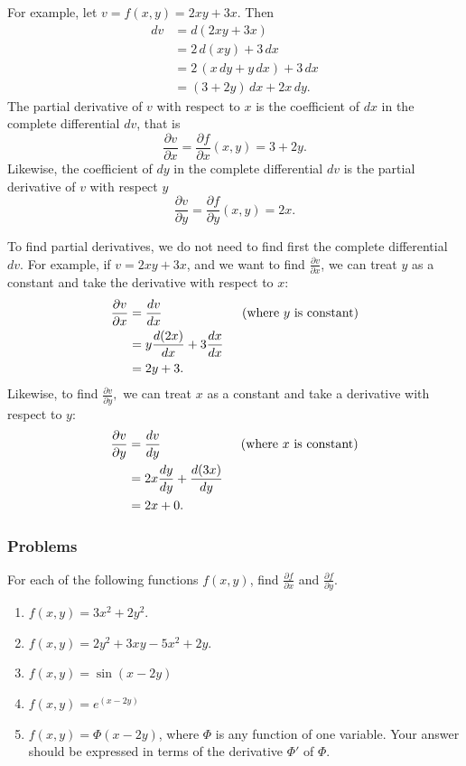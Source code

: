 \documentclass[twoside,openright]{article}
\begin{document}
For example, let $v = f(x,y)= 2xy + 3x.$  Then 
\begin{align*}
dv & = d(2xy + 3x)\\
& = 2\,d(xy) + 3\,dx\\
& = 2\,(x\,dy + y\,dx) + 3\,dx\\
& = (3 + 2y)\,dx + 2x\,dy.
\end{align*}
The partial derivative of $v$ with respect to $x$ is the coefficient
of $dx$ in the complete differential $dv$, that is
$$ \frac{\partial v}{\partial x}= \frac{\partial f}{\partial x} (x,y) = 3+2y.$$
Likewise, the coefficient of $dy$ in the complete differential $dv$ is
the partial derivative of $v$ with respect $y$
$$  \frac{\partial v}{\partial y} = \frac{\partial f}{\partial y} (x,y) = 2x.$$

To find partial derivatives, we do not need to find first the complete
differential $dv$.  For example, if $v= 2xy + 3x$, and we want to find
$\displaystyle \frac{\partial v}{\partial x}$, we can treat $y$ as a
constant and take the derivative with respect to $x$:
\begin{align*}
  \frac{\partial v}{\partial x}  & = \frac{dv}{dx} \text{\hspace{6em} (where $y$ is constant)}\\
                                 & = y \frac{d(2x)}{dx} + 3\frac{dx}{dx}\\
                                 & = 2y + 3.
\end{align*}
Likewise, to find $\displaystyle \frac{\partial v}{\partial y},$ we
can treat $x$ as a constant and take a derivative with respect to $y$:
\begin{align*}
  \frac{\partial v}{\partial y}  & = \frac{dv}{dy} \text{\hspace{6em} (where $x$ is constant)}\\
                                 & =  2x\frac{dy}{dy} + \frac{d(3x)}{dy}\\
                                 & = 2x +0.
\end{align*}

\subsubsection*{Problems}
For each of the following functions $f(x,y)$, find
$\displaystyle \frac{\partial f}{\partial x}$ and
$\displaystyle \frac{\partial f}{\partial y}$.
\begin{enumerate}
\itemsep0em
  \setcounter{enumi}{5}
\item $f(x,y) = 3x^2 + 2y^2.$
\item $f(x,y) = 2y^2 + 3xy - 5x^2 + 2y.$
\item $f(x,y) = \sin(x-2y)$
\item $f(x,y) = e^{(x-2y)}$
\item $f(x,y) = \Phi(x-2y)$, where $\Phi$ is any function of one
  variable.  Your answer should be expressed in terms of the
  derivative $\Phi'$ of $\Phi$.
\end{enumerate}
\end{document}
